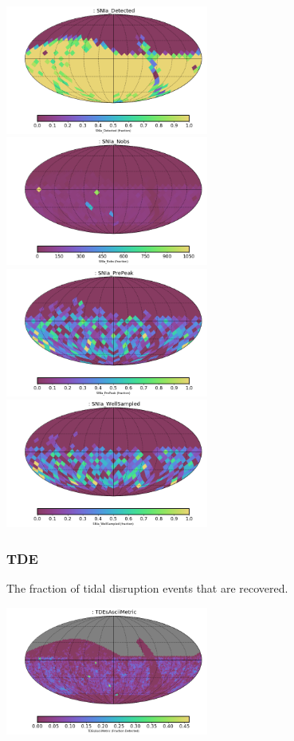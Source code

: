 {\includegraphics[width=0.5\textwidth]{metric_summary/sci_baseline_v1.4_10yrs/thumb._SNIa_Detected_USER_SkyMap.png}
\includegraphics[width=0.5\textwidth]{metric_summary/sci_baseline_v1.4_10yrs/thumb._SNIa_Nobs_USER_SkyMap.png}
\includegraphics[width=0.5\textwidth]{metric_summary/sci_baseline_v1.4_10yrs/thumb._SNIa_PrePeak_USER_SkyMap.png}
\includegraphics[width=0.5\textwidth]{metric_summary/sci_baseline_v1.4_10yrs/thumb._SNIa_WellSampled_USER_SkyMap.png}

\subsubsection{TDE}

The fraction of tidal disruption events that are recovered.

\includegraphics[width=0.5\textwidth]{metric_summary/sci_baseline_v1.4_10yrs/thumb._TDEsAsciiMetric_HEAL_SkyMap.png}

}
